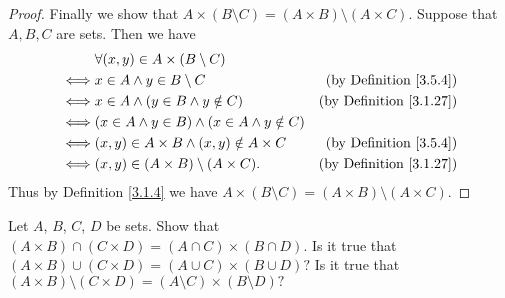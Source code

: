\begin{proof}
    Finally we show that \(A \times (B \setminus C) = (A \times B) \setminus (A \times C)\).
    Suppose that \(A, B, C\) are sets.
    Then we have
    \begin{align*}
             & \forall (x, y) \in A \times (B \setminus C)                                                    \\
        \iff & x \in A \land y \in B \setminus C                        & \text{(by Definition \ref{3.5.4})}  \\
        \iff & x \in A \land (y \in B \land y \notin C)                 & \text{(by Definition \ref{3.1.27})} \\
        \iff & (x \in A \land y \in B) \land (x \in A \land y \notin C)                                       \\
        \iff & (x, y) \in A \times B \land (x, y) \notin A \times C     & \text{(by Definition \ref{3.5.4})}  \\
        \iff & (x, y) \in (A \times B) \setminus (A \times C).          & \text{(by Definition \ref{3.1.27})}
    \end{align*}
    Thus by Definition \ref{3.1.4} we have \(A \times (B \setminus C) = (A \times B) \setminus (A \times C)\).
\end{proof}

\begin{exercise}\label{ex 3.5.5}
    Let \(A\), \(B\), \(C\), \(D\) be sets.
    Show that \((A \times B) \cap (C \times D) = (A \cap C) \times (B \cap D)\).
    Is it true that \((A \times B) \cup (C \times D) = (A \cup C) \times (B \cup D)?\)
    Is it true that \((A \times B) \setminus (C \times D) = (A \setminus C) \times (B \setminus D)?\)
\end{exercise}

